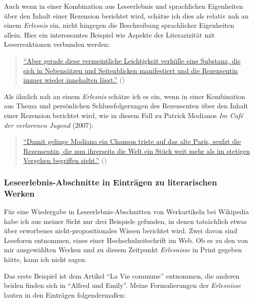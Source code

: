 \documentclass[fontsize=12pt]{scrartcl}
\begin{document}
Auch wenn in einer Kombination aus Leseerlebnis und sprachlichen Eigenhei\-ten \"uber den Inhalt einer Rezension berichtet wird, sch\"atze ich dies als relativ nah an einem \textit{Erlesnis} ein, nicht hingegen die Beschreibung sprachlicher Eigenhei\-ten allein. \mbox{Hier} ein interessantes Beispiel wie Aspekte der Literarizit\"at mit Leser\textsuperscript{\tiny *}reaktionen verbunden werden:

\singlespacing 
\begin{quote}
\href{http://www.perlentaucher.de/buch/zoya-pirzad/die-lichter-loesche-ich.html}{"`Aber gerade diese vermeintliche Leichtigkeit verh\"ulle eine Substanz, die sich in Nebens\"atzen und Sei\-tenblicken manifestiert und die Rezensentin immer wieder innehalten l\"asst."'} (\cite{Anonym*ohneDatum3})
\end{quote}
\onehalfspacing

Als \"ahnlich nah an einem \textit{Erlesnis} sch\"atze ich es ein, wenn in einer Kombination aus Thema und pers\"onlichen Schlussfolgerungen des Rezensenten\textsuperscript{\tiny *} \"uber den Inhalt einer Rezension berichtet wird, wie in diesem Fall zu Patrick Modianos \textit{Im Caf\'{e} der verlorenen Jugend} (2007):

\singlespacing 
\begin{quote}
\href{http://www.perlentaucher.de/buch/patrick-modiano/im-cafe-der-verlorenen-jugend.html}{"`Damit gelinge Modiano ein \flq Chanson triste\frq \,\,auf das alte Paris, seufzt die Rezensentin, die nun ihrerseits die Welt ein St\"uck weit mehr als im stetigen Vergehen begriffen sieht."'} (\cite{Anonym*ohneDatum6})
\end{quote}
\onehalfspacing

\pagebreak
\subsubsection{Leseerlebnis-Abschnitte in Eintr\"agen zu literarischen Werken}
\label{subsubsec:7.1.3}

F\"ur eine Wiedergabe in Leseerlebnis-Abschnitten von Werkartikeln bei Wi\-ki\-pe\-dia habe ich aus meiner Sicht nur drei Beispiele gefunden, in denen tats\"achlich etwas \"uber erworbenes nicht-pro\-po\-si\-ti\-o\-na\-les Wissen berichtet wird. Zwei davon sind Leseforen entnommen, eines einer Hochschulzeitschrift im Web. Ob es zu den von mir ausgew\"ahlten Werken und zu diesem Zeitpunkt \textit{Erlesnisse} in Print gegeben h\"atte, kann ich nicht sagen.

Das erste Beispiel ist dem Artikel "`La Vie commune"' entnommen, die anderen beiden finden sich in "`Alfred und Emily"'. Meine Formulierungen der \textit{Erlesnisse} lauten in den Eintr\"agen folgenderma{\ss}en: 
\end{document}
